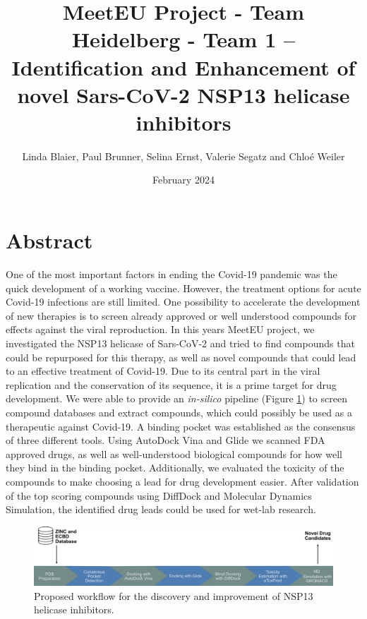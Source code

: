 \documentclass[11pt, letterpaper, titlepage]{article}
\title{MeetEU Project - Team Heidelberg - Team 1 -- \\ Identification and Enhancement of novel Sars-CoV-2 NSP13 helicase inhibitors}
\author{Linda Blaier, Paul Brunner, Selina Ernst, Valerie Segatz and Chlo\'{e} Weiler}
\date{February 2024}
\begin{document}
\maketitle
\noindent
\ihead{\headmark}
\cfoot{\pagemark}   %

\section{Abstract}
One of the most important factors in ending the Covid-19 pandemic was the quick development of a working vaccine. However, the treatment options for acute Covid-19 infections are still limited. One possibility to accelerate the development of new therapies is to screen already approved or well understood compounds for effects against the viral reproduction. In this years MeetEU project, we investigated the NSP13 helicase of Sars-CoV-2 and tried to find compounds that could be repurposed for this therapy, as well as novel compounds that could lead to an effective treatment of Covid-19. Due to its central part in the viral replication and the conservation of its sequence, it is a prime target for drug development. We were able to provide an \textit{in-silico} pipeline (Figure \ref{workflow}) to screen compound databases and extract compounds, which could possibly be used as a therapeutic against Covid-19. A binding pocket was established as the consensus of three different tools. Using AutoDock Vina and Glide we scanned FDA approved drugs, as well as well-understood biological compounds for how well they bind in the binding pocket. Additionally, we evaluated the toxicity of the compounds to make choosing a lead for drug development easier. After validation of the top scoring compounds using DiffDock and Molecular Dynamics Simulation, the identified drug leads could be used for wet-lab research. \\
\begin{figure}[h]
  \centering
  \includegraphics[width=\textwidth]{Workflow_MeetEU.pdf}
  \caption{Proposed workflow for the discovery and improvement of NSP13 helicase inhibitors.}
  \label{workflow}
\end{figure}
\newpage
\FloatBarrier
\end{document}
